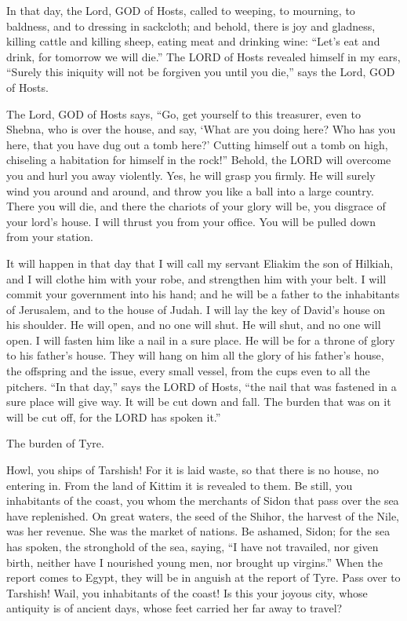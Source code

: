 \myverse{}In that day, the Lord, GOD of Hosts, called to weeping, to mourning,
to baldness, and to dressing in sackcloth;
\myverse{}and behold, there is joy and gladness, killing cattle and killing sheep,
eating meat and drinking wine: “Let’s eat and drink, for tomorrow we will die.”
\myverse{}The LORD of Hosts revealed himself in my ears, “Surely this iniquity will
not be forgiven you until you die,” says the Lord, GOD of Hosts.

\myverse{}The Lord, GOD of Hosts says, “Go, get yourself to this treasurer,
even to Shebna, who is over the house, and say,
\myverse{}‘What are you doing here? Who has you here, that you have dug out a tomb
here?’ Cutting himself out a tomb on high, chiseling a habitation for himself in the rock!”
\myverse{}Behold, the LORD will overcome you and hurl you away violently. Yes, he will
grasp you firmly.
\myverse{}He will surely wind you around and around, and throw you like a ball into
a large country. There you will die, and there the chariots of your glory will be, you disgrace of your
lord’s house.
\myverse{}I will thrust you from your office. You will be pulled down from your station.

\myverse{}It will happen in that day that I will call my servant Eliakim
the son of Hilkiah,
\myverse{}and I will clothe him with your robe, and strengthen him with your belt.
I will commit your government into his hand; and he will be a father to the inhabitants of Jerusalem,
and to the house of Judah.
\myverse{}I will lay the key of David’s house on his shoulder. He will open, and no
one will shut. He will shut, and no one will open.
\myverse{}I will fasten him like a nail in a sure place. He will be for a throne of
glory to his father’s house.
\myverse{}They will hang on him all the glory of his father’s house, the offspring
and the issue, every small vessel, from the cups even to all the pitchers.
\myverse{}“In that day,” says the LORD of Hosts, “the nail that was fastened in a sure
place will give way. It will be cut down and fall. The burden that was on it will be cut off, for the
LORD has spoken it.”


\mychapter{} \myverse*{}The burden of Tyre.

\quad\quad Howl, you ships of Tarshish! For it is laid waste, so that there is no house, no entering
in. From the land of Kittim it is revealed to them.
\myverse{}Be still, you inhabitants of the coast, you whom the merchants of Sidon that
pass over the sea have replenished.
\myverse{}On great waters, the seed of the Shihor, the harvest of the Nile, was her revenue.
She was the market of nations.
\myverse{}Be ashamed, Sidon; for the sea has spoken, the stronghold of the sea, saying,
“I have not travailed, nor given birth, neither have I nourished young men, nor brought up virgins.”
\myverse{}When the report comes to Egypt, they will be in anguish at the report of Tyre.
\myverse{}Pass over to Tarshish! Wail, you inhabitants of the coast!
\myverse{}Is this your joyous city, whose antiquity is of ancient days, whose feet carried
her far away to travel?

